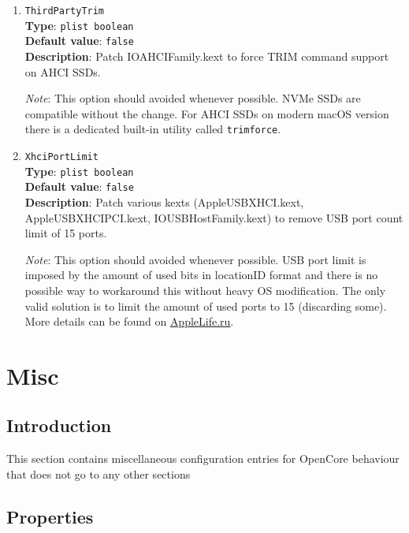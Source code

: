 \documentclass[]{article}
\begin{document}
\begin{enumerate}
\item
  \texttt{ThirdPartyTrim}\\
  \textbf{Type}: \texttt{plist\ boolean}\\
  \textbf{Default value}: \texttt{false}\\
  \textbf{Description}: Patch IOAHCIFamily.kext to force TRIM command support
  on AHCI SSDs.

  \emph{Note}: This option should avoided whenever possible. NVMe SSDs are
  compatible without the change. For AHCI SSDs on modern macOS version there
  is a dedicated built-in utility called \texttt{trimforce}.

\item
  \texttt{XhciPortLimit}\\
  \textbf{Type}: \texttt{plist\ boolean}\\
  \textbf{Default value}: \texttt{false}\\
  \textbf{Description}: Patch various kexts (AppleUSBXHCI.kext, AppleUSBXHCIPCI.kext,
  IOUSBHostFamily.kext) to remove USB port count limit of 15 ports.

  \emph{Note}: This option should avoided whenever possible. USB port limit
  is imposed by the amount of used bits in locationID format and there is no
  possible way to workaround this without heavy OS modification. The only
  valid solution is to limit the amount of used ports to 15 (discarding some).
  More details can be found on \href{https://applelife.ru/posts/550233}{AppleLife.ru}.

\end{enumerate}

\section{Misc}\label{misc}

\subsection{Introduction}\label{miscintro}

This section contains miscellaneous configuration entries for OpenCore
behaviour that does not go to any other sections

\subsection{Properties}\label{miscprops}
\end{document}

